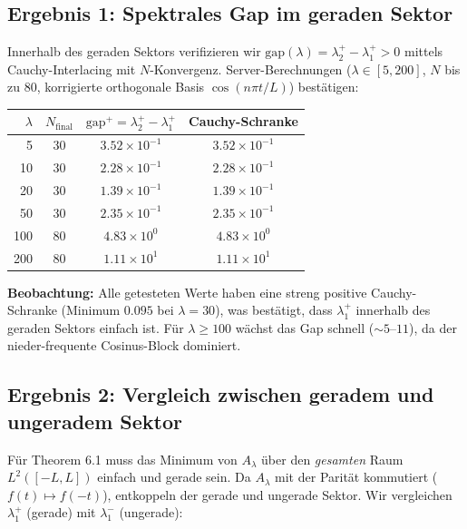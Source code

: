 \documentclass[12pt,a4paper]{article}
\theoremstyle{definition}
\theoremstyle{remark}
\begin{document}
\subsection{Ergebnis 1: Spektrales Gap im geraden Sektor}

Innerhalb des geraden Sektors verifizieren wir $\mathrm{gap}(\lambda) = \lambda_2^+ - \lambda_1^+ > 0$ mittels Cauchy-Interlacing mit $N$-Konvergenz. Server-Berechnungen ($\lambda \in [5,200]$, $N$ bis zu 80, korrigierte orthogonale Basis $\cos(n\pi t/L)$) bestätigen:

\medskip
\begin{center}
\renewcommand{\arraystretch}{1.2}
\begin{tabular}{r|c|c|c}
$\lambda$ & $N_{\mathrm{final}}$ & $\mathrm{gap}^+ = \lambda_2^+ - \lambda_1^+$ & Cauchy-Schranke \\\hline
5 & 30 & $3.52\times 10^{-1}$ & $3.52\times 10^{-1}$ \\
10 & 30 & $2.28\times 10^{-1}$ & $2.28\times 10^{-1}$ \\
20 & 30 & $1.39\times 10^{-1}$ & $1.39\times 10^{-1}$ \\
50 & 30 & $2.35\times 10^{-1}$ & $2.35\times 10^{-1}$ \\
100 & 80 & $4.83\times 10^{0}$ & $4.83\times 10^{0}$ \\
200 & 80 & $1.11\times 10^{1}$ & $1.11\times 10^{1}$ \\
\end{tabular}
\end{center}

\medskip\noindent
\textbf{Beobachtung:} Alle getesteten Werte haben eine streng positive Cauchy-Schranke (Minimum $0.095$ bei $\lambda=30$), was bestätigt, dass $\lambda_1^+$ innerhalb des geraden Sektors einfach ist. Für $\lambda \geq 100$ wächst das Gap schnell ($\sim 5$--$11$), da der nieder-frequente Cosinus-Block dominiert.

\subsection{Ergebnis 2: Vergleich zwischen geradem und ungeradem Sektor}

Für Theorem 6.1 muss das Minimum von $A_\lambda$ über den \emph{gesamten} Raum $L^2([-L,L])$ einfach und gerade sein. Da $A_\lambda$ mit der Parität kommutiert ($f(t)\mapsto f(-t)$), entkoppeln der gerade und ungerade Sektor. Wir vergleichen $\lambda_1^+$ (gerade) mit $\lambda_1^-$ (ungerade):
\end{document}
